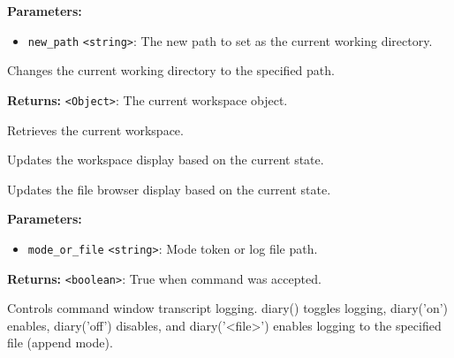 \documentclass[12pt,a4paper]{article}
\begin{document}
\noindent \textbf{Parameters:}
\begin{itemize}
  \item \texttt{new\_path} \texttt{<string>}: The new path to set as the current working directory.
\end{itemize}

\noindent Changes the current working directory to the specified path.

\vspace{5mm}
\noindent {}


\noindent \textbf{Returns:} \texttt{<Object>}: The current workspace object.

\noindent Retrieves the current workspace.

\vspace{5mm}
\noindent {}


\noindent Updates the workspace display based on the current state.

\vspace{5mm}
\noindent {}


\noindent Updates the file browser display based on the current state.

\vspace{5mm}
\noindent {}


\noindent \textbf{Parameters:}
\begin{itemize}
  \item \texttt{mode\_or\_file} \texttt{<string>}: Mode token or log file path.
\end{itemize}

\noindent \textbf{Returns:} \texttt{<boolean>}: True when command was accepted.

\noindent Controls command window transcript logging.
\textasciigrave{}diary()\textasciigrave{} toggles logging, \textasciigrave{}diary('on')\textasciigrave{} enables, \textasciigrave{}diary('off')\textasciigrave{} disables,
and \textasciigrave{}diary('<file>')\textasciigrave{} enables logging to the specified file (append mode).
\end{document}
